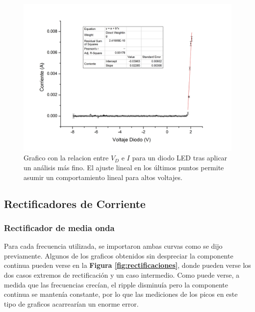 \documentclass[11pt,a4paper]{article}
\begin{document}
\begin{figure}[H]
\centering
\includegraphics[scale=0.36]{LED}
   \caption{Grafico con la relacion entre $V_D$ e $I$ para un diodo LED tras aplicar un análisis más fino. El ajuste lineal en los últimos puntos permite asumir un comportamiento lineal para altos voltajes.}
   \label{fig:LED}
\end{figure}



\subsection{Rectificadores de Corriente}



\subsubsection{Rectificador de media onda}

Para cada frecuencia utilizada, se importaron ambas curvas como se dijo previamente. Algunos de los graficos obtenidos sin despreciar la componente continua pueden verse en la \textbf{Figura \ref{fig:rectificaciones}}, donde pueden verse los dos casos extremos de rectificación y un caso intermedio. Como puede verse, a medida que las frecuencias crecían, el ripple disminuía pero la componente continua se mantenía constante, por lo que las mediciones de los picos en este tipo de graficos acarrearían un enorme error. 
\end{document}
